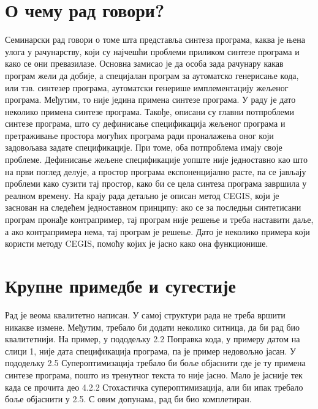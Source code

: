\documentclass[a4paper]{report}
\begin{document}
\section{О чему рад говори?}
\par Семинарски рад говори о томе шта представља синтеза програма, каква је њена улога у рачунарству, који су најчешћи проблеми приликом синтезе програма и како се они превазилазе. Основна замисао је да особа зада рачунару какав програм жели да добије, а специјалан програм за аутоматско генерисање кода, или тзв. синтезер програма, аутоматски генерише имплементацију жељеног програма. Међутим, то није једина примена синтезе програма. У раду је дато неколико примена синтезе програма. Такође, описани су главни потпроблеми синтезе програма, што су дефинисање спецификација жељеног програма и претраживање простора могућих програма ради проналажења оног који задовољава задате спецификације. При томе, оба потпроблема имају своје проблеме. Дефинисање жељене спецификације уопште није једноставно као што на први поглед делује, а простор програма експоненцијално расте, па се јављају проблеми како сузити тај простор, како би се цела синтеза програма завршила у реалном времену. На крају рада детаљно је описан метод CEGIS, који је заснован на следећем једноставном принципу: ако се за последњи синтетисани програм пронађе контрапример, тај програм није решење и треба наставити даље, а ако контрапримера нема, тај програм је решење. Дато је неколико примера који користи методу CEGIS, помоћу којих је јасно како она функционише.

\section{Крупне примедбе и сугестије}
\par Рад је веома квалитетно написан. У самој структури рада не треба вршити никакве измене. Међутим, требало би додати неколико ситница, да би рад био квалитетнији. На пример, у пододељку 2.2 Поправка кода, у примеру датом на слици 1, није дата спецификација програма, па је пример недовољно јасан. У пододељку 2.5 Супероптимизација требало би боље објаснити где је ту примена синтезе програма, пошто из тренутног текста то није јасно. Мало је јасније тек када се прочита део 4.2.2 Стохастичка супероптимизација, али би ипак требало боље објаснити у 2.5. С овим допунама, рад би био комплетиран. 
\end{document}
